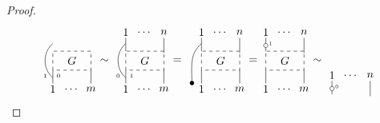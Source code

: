 \documentclass{amsart}
\renewcommand{\1}{\mathbf{1}}
\theoremstyle{definition}
\begin{document}
\begin{proof}
\begin{equation*}
{\begin{tikzpicture}[scale=.6]
		\draw [dashed] (0,0) rectangle (2,1); \node at (1, .5) {$G$};
		
		\draw (0,-.4)  to[out=140,in=-140]  (0,1.4);
		\node at (0,-1) {$1$}; \draw (0,-.7) -- (0,0);
		\node at (1,-1) {$\dots$};
		\node at (2,-1) {$m$}; \draw (2,-.7) -- (2,0);
		
		\node at (-.4,-.3){$\scriptscriptstyle{1}$};
		\node at (.3,-.3){$\scriptscriptstyle{0}$};
		
		\node at (2.7,.5) {$\sim$}; 
		\end{tikzpicture}
		\begin{tikzpicture}[scale=.6]
		\node at (0,2) {$1$}; \draw (0,1.7) -- (0,1);
		\node at (1,2) {$\dots$};
		\node at (2,2) {$n$}; \draw (2,1.7) -- (2,.9);
		
		\draw [dashed] (0,0) rectangle (2,1); \node at (1, .5) {$G$};
		
		\draw (0,-.4)  to[out=140,in=-140]  (0,1.4);
		\node at (0,-1) {$1$}; \draw (0,-.7) -- (0,0);
		\node at (1,-1) {$\dots$};
		\node at (2,-1) {$m$}; \draw (2,-.7) -- (2,0);
		
		\node at (-.4,-.3){$\scriptscriptstyle{0}$};
		\node at (.3,-.3){$\scriptscriptstyle{1}$};
		
		\node at (2.7,.5) {$=$}; 
		\end{tikzpicture}
		\begin{tikzpicture}[scale=.6]
		\node at (0,2) {$1$}; \draw (0,1.7) -- (0,1);
		\node at (1,2) {$\dots$};
		\node at (2,2) {$n$}; \draw (2,1.7) -- (2,.9);
		
		\draw [dashed] (0,0) rectangle (2,1); \node at (1, .5) {$G$};
		
		\node at (-.5,-.7) {$\bullet$}; \draw (-.5,-.7)  to[out=90,in=-140]  (0,1.4);
		\node at (0,-1) {$1$}; \draw (0,-.7) -- (0,0);
		\node at (1,-1) {$\dots$};
		\node at (2,-1) {$m$}; \draw (2,-.7) -- (2,0);
		\node at (2.7,.5) {$=$}; 
		\end{tikzpicture}
		\!
		\begin{tikzpicture}[scale=.6]
		\node at (0,2) {$1$}; \draw (0,1.7) -- (0,1);
		\draw [fill=white] (0,1.3) circle [radius=0.11];
		\node at (.25,1.4)[scale = .5]{$1$};
		\node at (1,2) {$\dots$};
		\node at (2,2) {$n$}; \draw (2,1.7) -- (2,.9);
		
		\draw [dashed] (0,0) rectangle (2,1); \node at (1, .5) {$G$};
		
		\node at (0,-1) {$1$}; \draw (0,-.7) -- (0,0);
		\node at (1,-1) {$\dots$};
		\node at (2,-1) {$m$}; \draw (2,-.7) -- (2,0);
		\node at (2.7,.5) {$\sim$}; 
		\end{tikzpicture}
		\begin{tikzpicture}[scale=.6]
		\node at (0,2) {$1$}; \draw (0,1.7) -- (0,1);
		\draw [fill=white] (0,1.3) circle [radius=0.11];
		\node at (.25,1.4)[scale = .5]{$0$};
		\node at (1,2) {$\dots$};
		\node at (2,2) {$n$}; \draw (2,1.7) -- (2,.9);
		

\end{tikzpicture}}
\end{equation*}
\end{proof}
\end{document}
